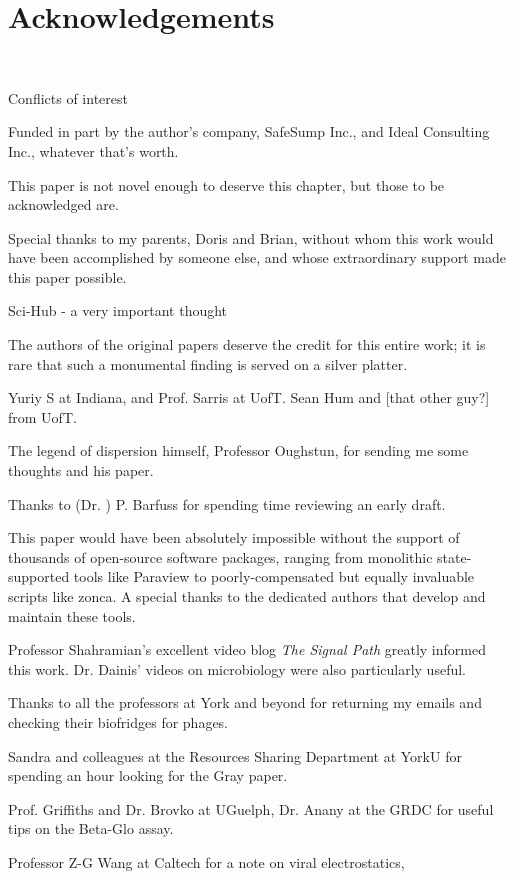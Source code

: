 \documentclass[paper.tex]{subfiles}
\begin{document}
	
\clearpage
\section{Acknowledgements}\

Conflicts of interest

Funded in part by the author's company, SafeSump Inc., and Ideal Consulting Inc., whatever that's worth.

This paper is not novel enough to deserve this chapter, but those to be acknowledged are.

Special thanks to my parents, Doris and Brian, without whom this work would have been accomplished by someone else, and whose extraordinary support made this paper possible.

Sci-Hub - a very important thought

The authors of the original papers deserve the credit for this entire work; it is rare that such a monumental finding is served on a silver platter.

Yuriy S at Indiana, and Prof. Sarris at UofT. Sean Hum and [that other guy?] from UofT.

The legend of dispersion himself, Professor Oughstun, for sending me some thoughts and his paper.

Thanks to (Dr. ) P. Barfuss for spending time reviewing an early draft.

This paper would have been absolutely impossible without the support of thousands of open-source software packages, ranging from monolithic state-supported tools like Paraview to poorly-compensated but equally invaluable scripts like zonca. A special thanks to the dedicated authors that develop and maintain these tools.

Professor Shahramian's excellent video blog {\it The Signal Path} greatly informed this work. Dr. Dainis' videos on microbiology were also particularly useful.

Thanks to all the professors at York and beyond for returning my emails and checking their biofridges for phages.

Sandra and colleagues at the Resources Sharing Department at YorkU for spending an hour looking for 
the Gray paper.

Prof. Griffiths and Dr. Brovko at UGuelph, Dr. Anany at the GRDC for useful tips on the Beta-Glo assay.

Professor Z-G Wang at Caltech for a note on viral electrostatics, 
\end{document}
